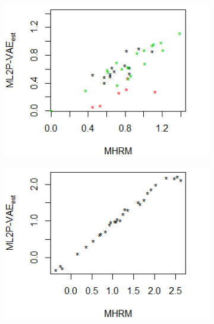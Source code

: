 \begin{figure}[h]
\centering
    \begin{subfigure}{.32\textwidth}
      \centering
      \includegraphics[width=.9\linewidth]{img/ml_journal_results/ecpe/vae_est_disc_ecpe.png}
    \end{subfigure}
    \begin{subfigure}{.32\textwidth}
      \centering
      \includegraphics[width=.9\linewidth]{img/ml_journal_results/ecpe/vae_est_diff_ecpe.png}
    \end{subfigure}
    \begin{subfigure}{.32\textwidth}
      \centering

\end{subfigure}
\end{figure}
